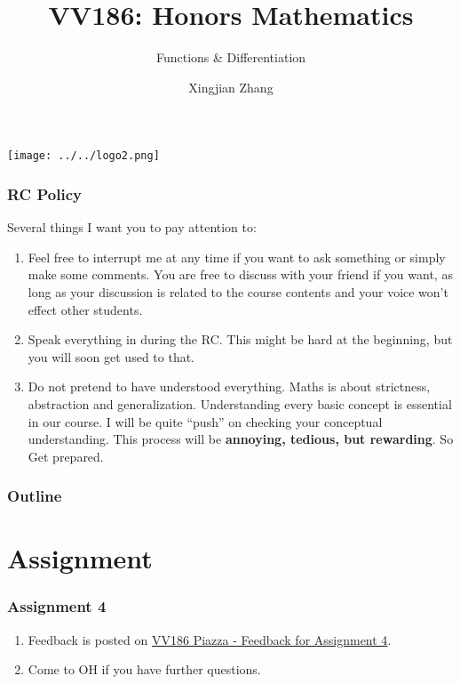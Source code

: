 \documentclass[10pt, t]{beamer}
\title{VV186: Honors Mathematics}
\subtitle{Functions \& Differentiation}
\institute[UM-SJTU JI]{Univerity of Michigan-Shanghai Jiao Tong University Joint Institute}
\author{Xingjian Zhang}
\newcommand{\alarm}[1]{{\color{bladerunnerred}{#1}}}
\begin{document}
\begin{frame}
    \titlepage
    \begin{center}
        \texttt{[image: ../../logo2.png]}
    \end{center}
\end{frame}

\begin{frame}
    \frametitle{RC Policy}
    Several things I want you to pay attention to:
    \begin{enumerate}
        \item \alarm{Be interactive.} Feel free to interrupt me at any time if you want to ask something or simply make some comments. You are free to discuss with your friend if you want, as long as your discussion is related to the course contents and your voice won't effect other students.
        \item Speak everything in \alarm{English} during the RC. This might be hard at the beginning, but you will soon get used to that.
        \item \alarm{``Question everything.''} Do not pretend to have understood everything. Maths is about strictness, abstraction and generalization. Understanding every basic concept is essential in our course. I will be quite ``push'' on checking your conceptual understanding. This process will be \textbf{annoying, tedious, but rewarding}. So Get prepared.
    \end{enumerate}
\end{frame}

\begin{frame}
    \frametitle{Outline}
    \begin{spacing}{1}
        \tableofcontents
    \end{spacing}
\end{frame}

\section{Assignment}
\begin{frame}
    \frametitle{Assignment 4}
    \begin{enumerate}
        \item Feedback is posted on \href{https://piazza.com/class/kdvbtz3cxva7mb?cid=79}{VV186 Piazza - Feedback for Assignment 4}.
        \item Come to OH if you have further questions.
    \end{enumerate}
\end{frame}
\end{document}
